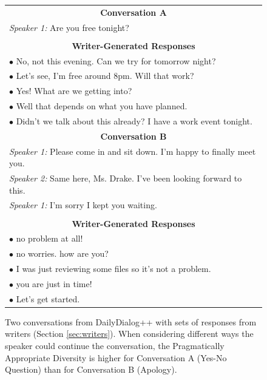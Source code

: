 \documentclass[11pt]{article}
\newcommand{\edivspace}{Pragmatically Appropriate Diversity }
\begin{document}
\begin{figure}[t]
    \centering
    \small
    \begin{tabular}{p{7.5cm}}
        \multicolumn{1}{c}{\bfseries Conversation A}\\
        \textit{Speaker 1:} Are you free tonight?\\
        \\
        \multicolumn{1}{c}{\bfseries Writer-Generated Responses}\\
        $\bullet$ No, not this evening. Can we try for tomorrow night?\\
        $\bullet$ Let's see, I'm free around 8pm. Will that work?\\
        $\bullet$ Yes! What are we getting into?\\
        $\bullet$ Well that depends on what you have planned.\\
        $\bullet$ Didn't we talk about this already? I have a work event tonight.
        \\
        \multicolumn{1}{c}{\bfseries Conversation B}\\
        \textit{Speaker 1:} Please come in and sit down. I’m happy to finally meet you. \\
        \hangindent=0.7cm \hspace{0.7cm}\textit{Speaker 2:} Same here, Ms. Drake. I've been looking forward to this. \\
        \textit{Speaker 1:} I’m sorry I kept you waiting.\\
        \\
        \multicolumn{1}{c}{\bfseries Writer-Generated Responses}\\
        $\bullet$ no problem at all!\\
        $\bullet$ no worries. how are you?\\
        $\bullet$ I was just reviewing some files so it's not a problem.\\
        $\bullet$ you are just in time!\\
        $\bullet$ Let's get started.\\
    \end{tabular}
    \caption{Two conversations from DailyDialog++ with sets of responses from writers (Section \ref{sec:writers}).  When considering different ways the speaker could continue the conversation, the \edivspace is higher for Conversation A (Yes-No Question) than for Conversation B (Apology). } 
    \label{fig:sample_convo}
\end{figure}
\end{document}
